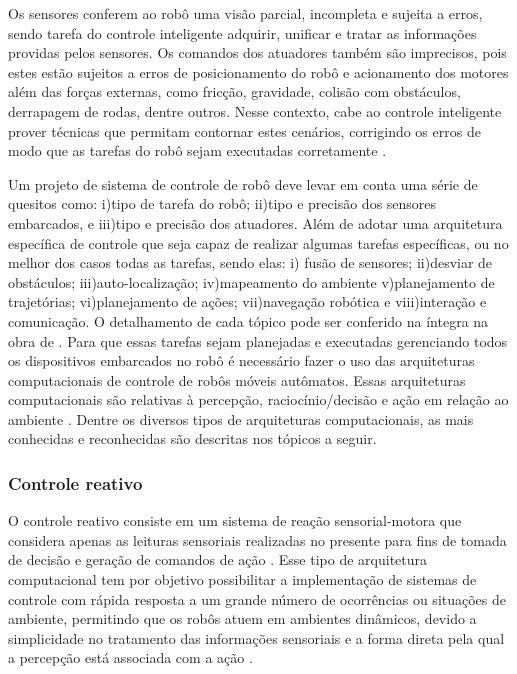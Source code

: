Os sensores conferem ao robô uma visão parcial, incompleta e sujeita a erros, sendo tarefa do controle inteligente adquirir, unificar e tratar as informações providas pelos sensores. Os comandos dos atuadores também são imprecisos, pois estes estão sujeitos a erros de posicionamento do robô e acionamento dos motores além das forças externas, como fricção, gravidade, colisão com obstáculos, derrapagem de rodas, dentre outros. Nesse contexto, cabe ao controle inteligente prover técnicas que permitam contornar estes cenários, corrigindo os erros de modo que as tarefas do robô sejam executadas corretamente \cite{wolf2009robotica}.

Um projeto de sistema de controle de robô deve levar em conta uma série de quesitos como: i)tipo de tarefa do robô; ii)tipo e precisão dos sensores embarcados, e iii)tipo e precisão dos atuadores. Além de adotar uma arquitetura específica de controle que seja capaz de realizar algumas tarefas específicas, ou no melhor dos casos todas as tarefas, sendo elas: i) fusão de sensores; ii)desviar de obstáculos; iii)auto-localização; iv)mapeamento do ambiente v)planejamento de trajetórias; vi)planejamento de ações; vii)navegação robótica e viii)interação e comunicação. O detalhamento de cada tópico pode ser conferido na íntegra na obra de \cite{wolf2009robotica}. 
Para que essas tarefas sejam planejadas e executadas gerenciando todos os dispositivos embarcados no robô é necessário fazer o uso das arquiteturas computacionais de controle de robôs móveis autômatos. Essas arquiteturas computacionais são relativas à percepção, raciocínio/decisão e ação em relação ao ambiente \cite{wolf2009robotica}. Dentre os diversos tipos de arquiteturas computacionais, as mais conhecidas e reconhecidas são descritas nos tópicos a seguir.

\subsubsection{Controle reativo}
O controle reativo consiste em um sistema de reação sensorial-motora que considera apenas as leituras sensoriais realizadas no presente para fins de tomada de decisão e geração de comandos de ação \cite{wolf2009robotica}. Esse tipo de arquitetura computacional tem por objetivo possibilitar a implementação de sistemas de controle com rápida resposta a um grande número de ocorrências ou situações de ambiente, permitindo que os robôs atuem em ambientes dinâmicos, devido a simplicidade no tratamento das informações sensoriais e a forma direta pela qual a percepção está associada com a ação . 

